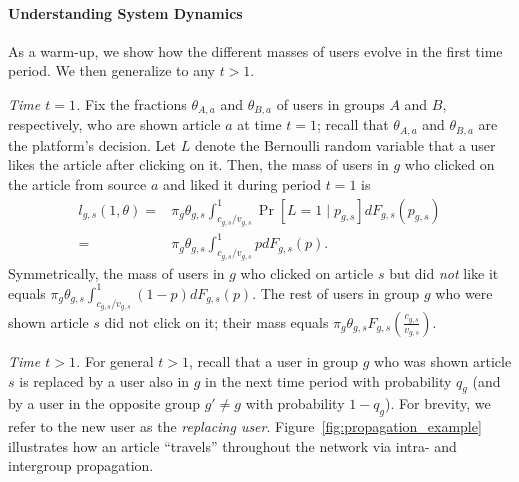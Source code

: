 \documentclass[letterpaper]{article} %
\begin{document}
\paragraph{Understanding System Dynamics}
As a warm-up, we show how the different masses of users evolve in the first time period.
%
We then generalize to any $t>1$.

\emph{Time ${t=1}$.}
Fix the fractions $\theta_{A,a}$ and $\theta_{B,a}$ of users in groups $A$ and $B$, respectively, who are shown article $a$ at time $t=1$; recall that $\theta_{A,a}$ and $\theta_{B,a}$ are the platform's decision.
%
Let $L$ denote the Bernoulli random variable that a user likes the article after clicking on it.
%
Then, the mass of users in $g$ who clicked on the article from source $a$ and liked it during period $t=1$ is
\footnotesize
\begin{align*}
        l_{g,s}(1, \theta)%
        =&\pi_g \theta_{g,s} \int_{c_{g,s}/v_{g,s}}^1 \Pr[L=1 \mid p_{g,s}] d F_{g,s} (p_{g,s}) \\
        =& \pi_g \theta_{g,s} \int_{c_{g,s}/v_{g,s}}^1 p d F_{g,s}(p).
\end{align*}
\normalsize
Symmetrically, the mass of users in $g$ who clicked on  article $s$ but did \emph{not} like it equals $\pi_g \theta_{g,s} \int_{c_{g,s}/v_{g,s}}^1 (1-p) d F_{g,s}(p)$. 
%
The rest of  users  in group $g$ who were shown article $s$ did not click on it; their mass equals $\pi_g \theta_{g,s} F_{g,s}\left(\frac{c_{g,s}}{v_{g,s}}\right)$.

\emph{Time $t>1$.} 
For general $t>1$, recall that a user in group $g$ who was shown article $s$ is replaced by a user also in $g$ in the next time period with probability $q_g$ (and by a user in the opposite group $g' \neq g$ with probability $1-q_g$).
%
For brevity, we refer to the new user as the \textit{replacing user}. 
%
Figure~\ref{fig:propagation_example} illustrates how an article ``travels'' throughout the network via intra- and intergroup propagation.
\end{document}
